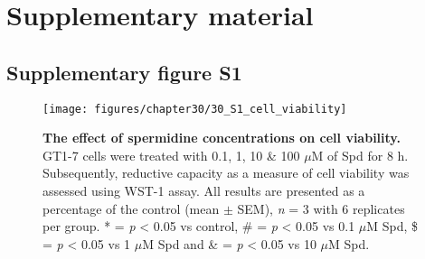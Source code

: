 \chapter*{Supplementary material}

\section*{Supplementary figure S1}

\begin{figure}[!htbp]
  \center
    \texttt{[image: figures/chapter30/30\_S1\_cell\_viability]}
  	\caption[]{\textbf{The effect of spermidine concentrations on cell viability.} GT1-7 cells were treated with 0.1, 1, 10 \& 100 $\mu$M of Spd for 8 h. Subsequently, reductive capacity as a measure of cell viability was assessed using WST-1 assay. All results are presented as a percentage of the control (mean $\pm$ SEM), \textit{n} = 3 with 6 replicates per group. * = \textit{p} < 0.05 vs control, \# = \textit{p} < 0.05 vs 0.1 $\mu$M Spd, \$ = \textit{p} < 0.05 vs 1 $\mu$M Spd and \& = \textit{p} < 0.05 vs 10 $\mu$M Spd.}
  \label{fig:30_S1_cell_viability}
\end{figure}
